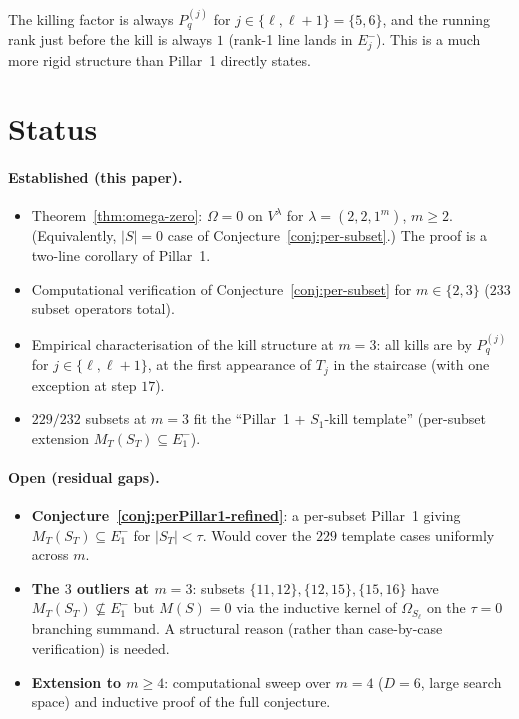 \documentclass[11pt]{article}
\theoremstyle{definition}
\newcommand{\Vlam}{V^\lambda}
\newcommand{\Om}{\Omega}
\newcommand{\Eminus}[1]{E^-_{#1}}
\begin{document}
\noindent
The killing factor is always $P_q^{(j)}$ for $j \in \{\ell, \ell+1\} = \{5,6\}$,
and the running rank just before the kill is always $1$ (rank-1 line lands in
$\Eminus j$). This is a much more rigid structure than Pillar~1 directly
states.

\section{Status}\label{sec:status}

\paragraph{Established (this paper).}
\begin{itemize}[topsep=0.2em,itemsep=0.1em]
\item Theorem~\ref{thm:omega-zero}: $\Om = 0$ on $\Vlam$ for
   $\lambda = (2,2,1^m)$, $m \ge 2$. (Equivalently, $|S|=0$ case of
   Conjecture~\ref{conj:per-subset}.) The proof is a two-line corollary of
   Pillar~1.
\item Computational verification of Conjecture~\ref{conj:per-subset} for
   $m \in \{2, 3\}$ ($233$ subset operators total).
\item Empirical characterisation of the kill structure at $m=3$: all kills
   are by $P_q^{(j)}$ for $j \in \{\ell, \ell+1\}$, at the first appearance
   of $T_j$ in the staircase (with one exception at step $17$).
\item $229/232$ subsets at $m=3$ fit the ``Pillar~1 + $S_1$-kill template''
   (per-subset extension $M_T(S_T) \subseteq \Eminus 1$).
\end{itemize}

\paragraph{Open (residual gaps).}
\begin{itemize}[topsep=0.2em,itemsep=0.1em]
\item \textbf{Conjecture~\ref{conj:perPillar1-refined}}: a per-subset Pillar~1
   giving $M_T(S_T) \subseteq \Eminus 1$ for $|S_T| < \tau$. Would cover the
   $229$ template cases uniformly across $m$.
\item \textbf{The $3$ outliers at $m=3$}: subsets
   $\{11,12\}, \{12,15\}, \{15,16\}$ have $M_T(S_T) \not\subseteq \Eminus 1$
   but $M(S) = 0$ via the inductive kernel of $\Om_{S_\ell}$ on the
   $\tau = 0$ branching summand. A structural reason (rather than
   case-by-case verification) is needed.
\item \textbf{Extension to $m \ge 4$}: computational sweep over $m=4$
   ($D = 6$, large search space) and inductive proof of the full
   conjecture.
\end{itemize}
\end{document}
